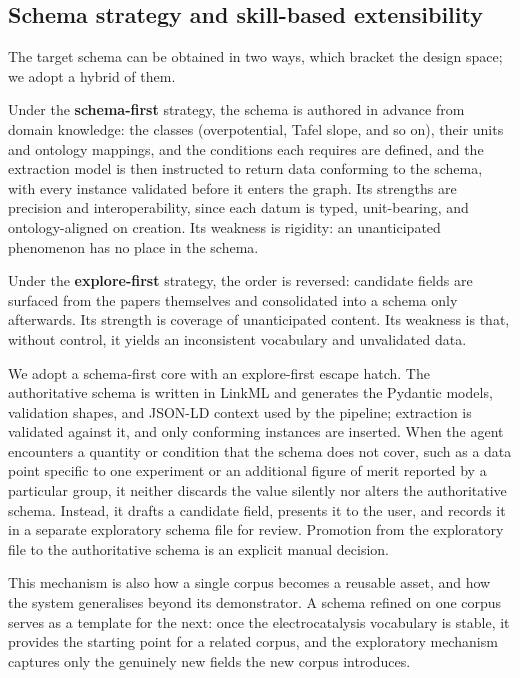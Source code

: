 \documentclass{template}
\begin{document}
\subsection{Schema strategy and skill-based extensibility}

The target schema can be obtained in two ways, which bracket the design space; we adopt a hybrid of them.

Under the \textbf{schema-first} strategy, the schema is authored in advance from domain knowledge: the classes (overpotential, Tafel slope, and so on), their units and ontology mappings, and the conditions each requires are defined, and the extraction model is then instructed to return data conforming to the schema, with every instance validated before it enters the graph. Its strengths are precision and interoperability, since each datum is typed, unit-bearing, and ontology-aligned on creation. Its weakness is rigidity: an unanticipated phenomenon has no place in the schema.

Under the \textbf{explore-first} strategy, the order is reversed: candidate fields are surfaced from the papers themselves and consolidated into a schema only afterwards. Its strength is coverage of unanticipated content. Its weakness is that, without control, it yields an inconsistent vocabulary and unvalidated data.

We adopt a schema-first core with an explore-first escape hatch. The authoritative schema is written in LinkML and generates the Pydantic models, validation shapes, and JSON-LD context used by the pipeline; extraction is validated against it, and only conforming instances are inserted. When the agent encounters a quantity or condition that the schema does not cover, such as a data point specific to one experiment or an additional figure of merit reported by a particular group, it neither discards the value silently nor alters the authoritative schema. Instead, it drafts a candidate field, presents it to the user, and records it in a separate exploratory schema file for review. Promotion from the exploratory file to the authoritative schema is an explicit manual decision.

This mechanism is also how a single corpus becomes a reusable asset, and how the system generalises beyond its demonstrator. A schema refined on one corpus serves as a template for the next: once the electrocatalysis vocabulary is stable, it provides the starting point for a related corpus, and the exploratory mechanism captures only the genuinely new fields the new corpus introduces.
\end{document}

